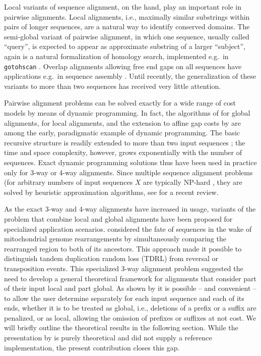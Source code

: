 \documentclass[a4paper,10pt]{article}
\let\cite\citep
\begin{document}
Local variants of sequence alignment, on the hand, play an important role
in pairwise alignments. Local alignments, i.e., maximally similar
substrings within pairs of longer sequences, are a natural way to identify
conserved domains.  The semi-global variant of pairwise alignment, in which
one sequence, usually called ``query'', is expected to appear as
approximate substring of a larger ``subject'', again is a natural
formalization of homology search, implemented e.g.\ in \texttt{gotohscan}
\cite{Hertel:09a}.  Overlap alignments \cite{Jones:04} allowing free end
gaps on all sequences have applications e.g.\ in sequence assembly
\cite{Rausch:09}. Until recently, the generalization of these variants to
more than two sequences has received very little attention.

Pairwise alignment problems can be solved exactly for a wide range of cost
models by means of dynamic programming. In fact, the algorithms of
\citet{Needleman:70} for global alignments, \citet{Smith:81} for local
alignments, and the extension to affine gap costs by \citet{Gotoh:82} are
among the early, paradigmatic example of dynamic programming. The basic
recursive structure is readily extended to more than two input sequences
\cite{Carillo:88,Lipman:89}; the time and space complexity, however, grows
exponentially with the number of sequences. Exact dynamic programming
solutions thus have been used in practice only for 3-way
\cite{Gotoh:86,Dewey:01,Konagurthu:04,Kruspe:07a} or 4-way
\cite{Steiner:11a} alignments. Since multiple sequence alignment problems
(for arbitrary numbers of input sequences $X$ are typically NP-hard
\cite{Kececioglu:93,Wang:94,Bonizzoni:01,Just:01,Manthey:03,Elias:06}, they
are solved by heuristic approximation algorithms, see \citet{Baichoo:17}
for a recent review.

As the exact 3-way and 4-way alignments have increased in usage, variants
of the problem that combine local and global alignments have been proposed
for specialized application scenarios. \citet{AlArab:17a} considered the
fate of sequences in the wake of mitochondrial genome rearrangements by
simultaneously comparing the rearranged region to both of its
ancestors. This approach made it possible to distinguish tandem duplication
random loss (TDRL) from reversal or transposition events. This specialized
3-way alignment problem suggested the need to develop a general theoretical
framework for alignments that consider part of their input local and part
global. As shown by \citet{Retzlaff:18a} it is possible -- and convenient
-- to allow the user determine separately for each input sequence and each
of its ends, whether it is to be treated as global, i.e., deletions of a
prefix or a suffix are penalized, or as local, allowing the omission of
prefixes or suffixes at not cost. We will briefly outline the theoretical
results in the following section. While the presentation by
\citet{Retzlaff:18a} is purely theoretical and did not supply a reference
implementation, the present contribution closes this gap.
\end{document}
